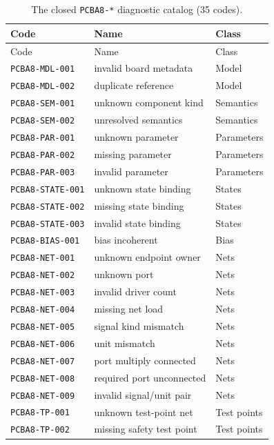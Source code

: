\begin{center}
\small
\begin{longtable}{@{}lll@{}}
\caption{The closed \texttt{PCBA8-*} diagnostic catalog (35 codes).}\label{ch07:tab:catalog}\\
\toprule
Code & Name & Class \\
\midrule
\endfirsthead
\toprule
Code & Name & Class \\
\midrule
\endhead
\bottomrule
\endfoot
\texttt{PCBA8-MDL-001} & invalid board metadata & Model \\
\texttt{PCBA8-MDL-002} & duplicate reference & Model \\
\texttt{PCBA8-SEM-001} & unknown component kind & Semantics \\
\texttt{PCBA8-SEM-002} & unresolved semantics & Semantics \\
\texttt{PCBA8-PAR-001} & unknown parameter & Parameters \\
\texttt{PCBA8-PAR-002} & missing parameter & Parameters \\
\texttt{PCBA8-PAR-003} & invalid parameter & Parameters \\
\texttt{PCBA8-STATE-001} & unknown state binding & States \\
\texttt{PCBA8-STATE-002} & missing state binding & States \\
\texttt{PCBA8-STATE-003} & invalid state binding & States \\
\texttt{PCBA8-BIAS-001} & bias incoherent & Bias \\
\texttt{PCBA8-NET-001} & unknown endpoint owner & Nets \\
\texttt{PCBA8-NET-002} & unknown port & Nets \\
\texttt{PCBA8-NET-003} & invalid driver count & Nets \\
\texttt{PCBA8-NET-004} & missing net load & Nets \\
\texttt{PCBA8-NET-005} & signal kind mismatch & Nets \\
\texttt{PCBA8-NET-006} & unit mismatch & Nets \\
\texttt{PCBA8-NET-007} & port multiply connected & Nets \\
\texttt{PCBA8-NET-008} & required port unconnected & Nets \\
\texttt{PCBA8-NET-009} & invalid signal/unit pair & Nets \\
\texttt{PCBA8-TP-001} & unknown test-point net & Test points \\
\texttt{PCBA8-TP-002} & missing safety test point & Test points \\

\end{longtable}
\end{center}
